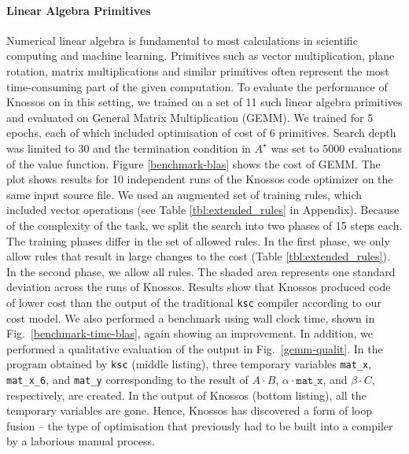 \documentclass[fullpage,twocolumn]{article} %
\begin{document}
\paragraph{Linear Algebra Primitives}
Numerical linear algebra is fundamental to most calculations in scientific computing and machine learning. Primitives such as vector multiplication, plane rotation, matrix multiplications and similar primitives often represent the most time-consuming part of the given computation. To evaluate the performance of Knossos on in this setting, we trained on a set of 11 such linear algebra primitives and evaluated on General Matrix Multiplication (GEMM). We trained for 5 epochs, each of which included optimisation of cost of 6 primitives. Search depth was limited to 30 and the termination condition in $A^\star$ was set to 5000 evaluations of the value function. Figure \ref{benchmark-blas} shows the cost of GEMM. The plot shows results for 10 independent runs of the Knossos code optimizer on the same input source file.
We used an augmented set of training rules, which included vector operations (see Table \ref{tbl:extended_rules} in Appendix). Because of the complexity of the task, we split the search into two phases of 15 steps each. The training phases differ in the set of allowed rules. In the first phase, we only allow rules that result in large changes to the cost (Table \ref{tbl:extended_rules}). In the second phase, we allow all rules.
The shaded area represents one standard deviation across the runs of Knossos. Results show that Knossos produced code of lower cost than the output of the traditional \texttt{ksc} compiler according to our cost model. We also performed a benchmark using wall clock time, shown in Fig.~\ref{benchmark-time-blas}, again showing an improvement. In addition, we performed a qualitative evaluation of the output in Fig.~\ref{gemm-qualit}.  In the program obtained by \texttt{ksc} (middle listing), three temporary variables \texttt{mat\_x}, \texttt{mat\_x\_6}, and \texttt{mat\_y} corresponding to the result of $A\cdot B$, $\alpha\cdot\texttt{mat\_x}$, and $\beta\cdot C$, respectively, are created. In the output of Knossos (bottom listing), all the temporary variables are gone. Hence, Knossos has discovered a form of loop fusion -- the type of optimisation that previously had to be built into a compiler by a laborious manual process.


  
\end{document}
